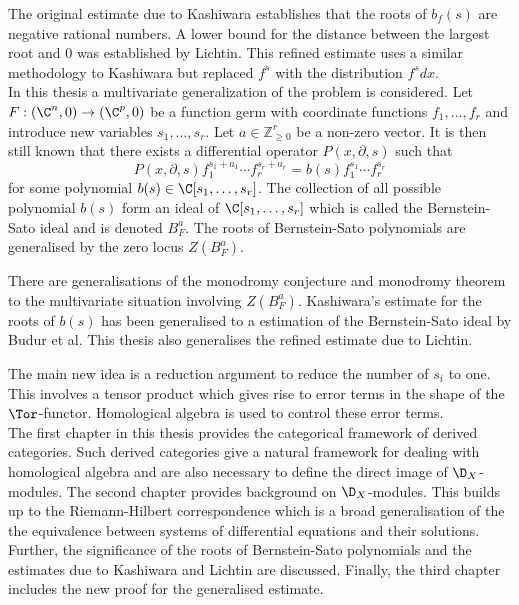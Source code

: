 The original estimate due to Kashiwara establishes that the roots of $b_f(s)$ are negative rational numbers.
A lower bound for the distance between the largest root and $0$ was established by Lichtin.
This refined estimate uses a similar methodology to Kashiwara but replaced $f^s$ with the distribution $f^s dx$.
\\

In this thesis a multivariate generalization of the problem is considered.
Let $F:(\C^{n},0)\to (\C^p,0)$ be a function germ with coordinate functions $f_1,\ldots, f_r$ and introduce new variables $s_1,\ldots, s_r$.
Let $a \in \mathbb{Z}_{\geq 0}^r$ be a non-zero vector.
It is then still known that there exists a differential operator $P(x,\partial, s)$ such that
$$P(x,\partial,s) f_1^{s_1 + a_1}\cdots f_r^{s_r + a_r} = b(s)f_1^{s_1}\cdots f_r^{s_r}$$
for some polynomial $b(s) \in \C[s_1,\ldots, s_r]$.
The collection of all possible polynomial $b(s)$ form an ideal of $\C[s_1,\ldots,s_r]$ which is called the Bernstein-Sato ideal and is denoted $B_{F}^a$.
The roots of Bernstein-Sato polynomials are generalised by the zero locus $Z(B_F^a)$.

There are generalisations of the monodromy conjecture and monodromy theorem to the multivariate situation involving $Z(B_F^a)$.
Kashiwara's estimate for the roots of $b(s)$ has been generalised to a estimation of the Bernstein-Sato ideal by Budur et al.
This thesis also generalises the refined estimate due to Lichtin.

The main new idea is a reduction argument to reduce the number of $s_i$ to one.
This involves a tensor product which gives rise to error terms in the shape of the $\Tor$-functor.
Homological algebra is used to control these error terms.
\\

The first chapter in this thesis provides the categorical framework of derived categories.
Such derived categories give a natural framework for dealing with homological algebra and are also necessary to define the direct image of $\D_X$-modules.
The second chapter provides background on $\D_X$-modules. This builds up to the Riemann-Hilbert correspondence which is a broad generalisation of the the equivalence between systems of differential equations and their solutions.
Further, the significance of the roots of Bernstein-Sato polynomials and the estimates due to Kashiwara and Lichtin are discussed.
Finally, the third chapter includes the new proof for the generalised estimate.
